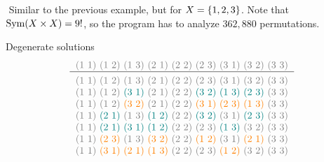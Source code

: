 \begin{xmpl}${}$
Similar to the previous example, but for $X=\{1,2,3\}$. Note that ${\rm Sym}(X\times X)=9!$, so the program has to analyze $362,880$ permutations.

Degenerate solutions
$$
	\begin{tabular}{c}
		\textcolor{gray}{(1 1) (1 2) (1 3) (2 1) (2 2) (2 3) (3 1) (3 2) (3 3)}\\
		\hline\\[-3mm]
		\textcolor{gray}{(1 1)} \textcolor{gray}{(1 2)} \textcolor{gray}{(1 3)} \textcolor{gray}{(2 1)} \textcolor{gray}{(2 2)} \textcolor{gray}{(2 3)} \textcolor{gray}{(3 1)} \textcolor{gray}{(3 2)} \textcolor{gray}{(3 3)}\\
		\textcolor{gray}{(1 1)} \textcolor{gray}{(1 2)} \textcolor{teal}{(3 1)} \textcolor{gray}{(2 1)} \textcolor{gray}{(2 2)} \textcolor{teal}{(3 2)} \textcolor{teal}{(1 3)} \textcolor{teal}{(2 3)} \textcolor{gray}{(3 3)}\\
		\textcolor{gray}{(1 1)} \textcolor{gray}{(1 2)} \textcolor{orange}{(3 2)} \textcolor{gray}{(2 1)} \textcolor{gray}{(2 2)} \textcolor{orange}{(3 1)} \textcolor{orange}{(2 3)} \textcolor{orange}{(1 3)} \textcolor{gray}{(3 3)}\\
		\textcolor{gray}{(1 1)} \textcolor{teal}{(2 1)} \textcolor{gray}{(1 3)} \textcolor{teal}{(1 2)} \textcolor{gray}{(2 2)} \textcolor{teal}{(3 2)} \textcolor{gray}{(3 1)} \textcolor{teal}{(2 3)} \textcolor{gray}{(3 3)}\\
		\textcolor{gray}{(1 1)} \textcolor{teal}{(2 1)} \textcolor{teal}{(3 1)} \textcolor{teal}{(1 2)} \textcolor{gray}{(2 2)} \textcolor{gray}{(2 3)} \textcolor{teal}{(1 3)} \textcolor{gray}{(3 2)} \textcolor{gray}{(3 3)}\\
		\textcolor{gray}{(1 1)} \textcolor{orange}{(2 3)} \textcolor{gray}{(1 3)} \textcolor{orange}{(3 2)} \textcolor{gray}{(2 2)} \textcolor{orange}{(1 2)} \textcolor{gray}{(3 1)} \textcolor{orange}{(2 1)} \textcolor{gray}{(3 3)}\\
		\textcolor{gray}{(1 1)} \textcolor{orange}{(3 1)} \textcolor{orange}{(2 1)} \textcolor{orange}{(1 3)} \textcolor{gray}{(2 2)} \textcolor{gray}{(2 3)} \textcolor{orange}{(1 2)} \textcolor{gray}{(3 2)} \textcolor{gray}{(3 3)}
	\end{tabular}
$$
\pagebreak


\end{xmpl}
